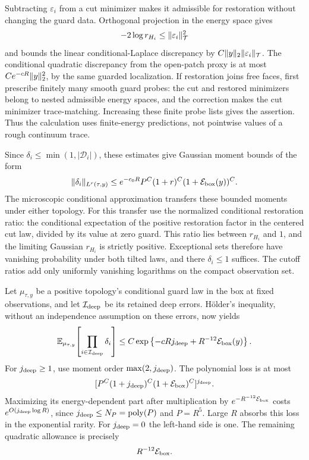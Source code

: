 Subtracting $\varepsilon_i$ from a cut minimizer makes it admissible
for restoration without changing the guard data. Orthogonal
projection in the energy space gives
\[
       -2\log r_{H_i}\le\lVert\varepsilon_i\rVert_{\mathcal T}^2
\]
and bounds the linear conditional-Laplace discrepancy by
$C\lVert y\rVert_2\lVert\varepsilon_i\rVert_{\mathcal T}$. The conditional
quadratic discrepancy from the open-patch proxy is at most
$Ce^{-cR}\lVert y\rVert_2^2$, by the same guarded localization.
If restoration joins free faces, first prescribe finitely many
smooth guard probes: the cut and restored minimizers belong to
nested admissible energy spaces, and the correction makes the
cut minimizer trace-matching. Increasing these finite probe lists
gives the assertion. Thus the calculation uses finite-energy
predictions, not pointwise values of a rough continuum trace.

Since $\delta_i\le\min(1,|\mathcal D_i|)$, these estimates give
Gaussian moment bounds of the form
\[
 \lVert\delta_i\rVert_{L^r(\tau,y)}
       \le e^{-c_0R}P^C(1+r)^C
                              (1+\mathcal E_{\rm box}(y))^C.
\]
The microscopic conditional approximation transfers these bounded
moments under either topology. For this transfer use the normalized
conditional restoration ratio: the conditional expectation of the
positive restoration factor in the centered cut law, divided by
its value at zero guard. This ratio lies between $r_{H_i}$ and $1$,
and the limiting Gaussian $r_{H_i}$ is strictly positive.
Exceptional sets therefore have vanishing
probability under both tilted laws, and there $\delta_i\le1$
suffices. The cutoff ratios add only uniformly vanishing logarithms
on the compact observation set.

Let $\mu_{\tau,y}$ be a positive topology's conditional guard law
in the box at fixed observations, and let $\mathcal I_{\rm deep}$
be its retained deep errors. H\"older's inequality, without an
independence assumption on these errors, now yields
\begin{equation}\label{eq:entry-good-box}
 \mathbb E_{\mu_{\tau,y}}\!
       \left[\prod_{i\in\mathcal I_{\rm deep}}\delta_i\right]
       \le C\exp\left\{-cRj_{\rm deep}
                          +R^{-12}\mathcal E_{\rm box}(y)\right\}.
\end{equation}
For $j_{\rm deep}\ge1$, use moment order
$\max(2,j_{\rm deep})$. The polynomial loss is at most
\[
       [P^C(1+j_{\rm deep})^C
                   (1+\mathcal E_{\rm box})^C]^{j_{\rm deep}}.
\]
Maximizing its energy-dependent part after multiplication by
$e^{-R^{-12}\mathcal E_{\rm box}}$ costs
$e^{O(j_{\rm deep}\log R)}$, since
$j_{\rm deep}\le N_P=\operatorname{poly}(P)$ and $P=R^5$.
Large $R$ absorbs this loss in the exponential rarity. For
$j_{\rm deep}=0$ the left-hand side is one. The remaining
quadratic allowance is precisely
\begin{equation}\label{eq:entry-good-allowance}
                         R^{-12}\mathcal E_{\rm box}.
\end{equation}

